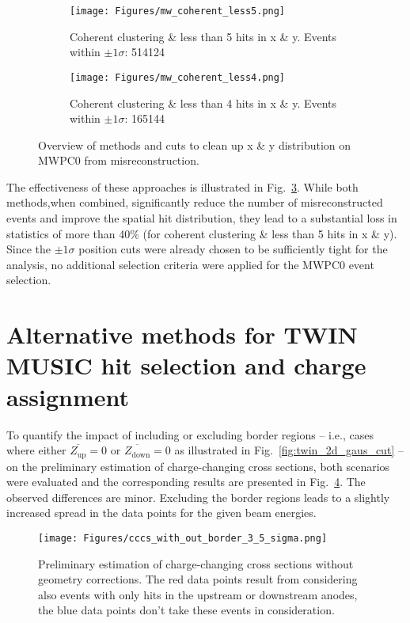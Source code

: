 \begin{appendices}
\begin{figure}
\begin{subfigure}{.45\textwidth}
  \centering
  \texttt{[image: Figures/mw\_coherent\_less5.png]}
  \caption{Coherent clustering \& less than 5 hits in x \& y. Events within $\pm1\sigma$: 514124}
  \label{fig:sub-third}
\end{subfigure}
\begin{subfigure}{.45\textwidth}
  \centering
  \texttt{[image: Figures/mw\_coherent\_less4.png]}
  \caption{Coherent clustering \& less than 4 hits in x \& y. Events within $\pm1\sigma$\protect\footnotemark: 165144}
  \label{fig:sub-fourth}
\end{subfigure}
\caption{Overview of methods and cuts to clean up x \& y distribution on MWPC0 from misreconstruction.}
\label{fig:mw0_approaches}
\end{figure}
The effectiveness of these approaches is illustrated in Fig.~\ref{fig:mw0_approaches}. While both methods,when combined, significantly reduce the number of misreconstructed events and improve the spatial hit distribution, they lead to a substantial loss in statistics of more than 40\% (for coherent clustering \& less than 5 hits in x \& y).\newline
Since the $\pm1\sigma$ position cuts were already chosen to be sufficiently tight for the analysis, no additional selection criteria were applied for the MWPC0 event selection.


\section {Alternative methods for TWIN MUSIC hit selection and charge assignment} \label{app:twin_alternative}
To quantify the impact of including or excluding border regions -- i.e., cases where either $\overline{Z_{\text{up}}} = 0$ or $\overline{Z_{\text{down}}} = 0$ as illustrated in Fig.~\ref{fig:twin_2d_gaus_cut} -- on the preliminary estimation of charge-changing cross sections, both scenarios were evaluated and the corresponding results are presented in Fig.~\ref{fig:cccs_with_out_border_3_5}. The observed differences are minor. Excluding the border regions leads to a slightly increased spread in the data points for the given beam energies.\newline
\begin{figure}[htpb]
    \centering
    \texttt{[image: Figures/cccs\_with\_out\_border\_3\_5\_sigma.png]}
    \caption{
    Preliminary estimation of charge-changing cross sections without geometry corrections. The red data points result from considering also events with only hits in the upstream or downstream anodes, the blue data points don't take these events in consideration.
     }
    \label{fig:cccs_with_out_border_3_5}
\end{figure}


\end{appendices}

